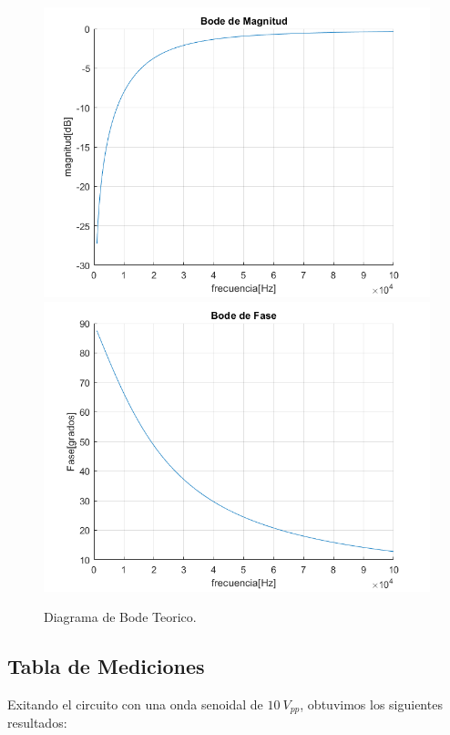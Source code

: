 \begin{figure}[h!]
\centering
\includegraphics[scale=0.5]{2teomag.png}
\includegraphics[scale=0.5]{2teofase.png}
\caption{Diagrama de Bode Teorico.}
\label{fig:CR}
\end{figure}

\subsection{Tabla de Mediciones}

Exitando el circuito con una onda senoidal de $10~V_{pp}$, obtuvimos los siguientes resultados:

